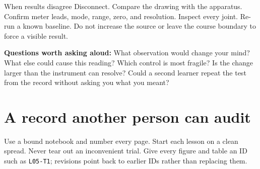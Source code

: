 \newpage
{}
\begin{gate}{When results disagree}
Disconnect. Compare the drawing with the apparatus. Confirm meter leads, mode,
range, zero, and resolution. Inspect every joint. Re-run a known baseline. Do
not increase the source or leave the course boundary to force a visible result.
\end{gate}
\begin{predict}
\textbf{Questions worth asking aloud:} What observation would change your mind?
What else could cause this reading? Which control is most fragile? Is the
change larger than the instrument can resolve? Could a second learner repeat
the test from the record without asking you what you meant?
\end{predict}
\section{A record another person can audit}
Use a bound notebook and number every page. Start each lesson on a clean spread.
Never tear out an inconvenient trial. Give every figure and table an ID such as
\texttt{L05-T1}; revisions point back to earlier IDs rather than replacing them.

\begin{center}
\end{center}

